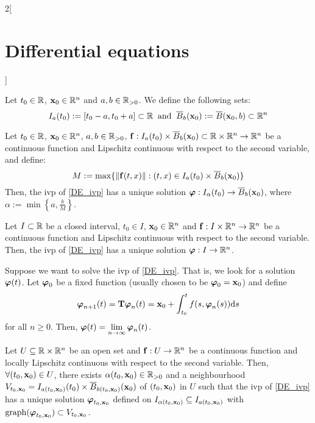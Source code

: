 \documentclass[../../../main.tex]{subfiles}
\begin{document}
\begin{multicols}{2}[\section{Differential equations}]
\begin{corollary}
  \end{corollary}
  \begin{definition}
    Let $t_0\in\mathbb{R}$, $\boldsymbol{\mathrm{x}}_0\in\mathbb{R}^n$ and $a,b\in\mathbb{R}_{>0}$. We define the following sets: $$I_a(t_0):=[t_0-a,t_0+a]\subset\mathbb{R}\;\;\text{and}\;\;\overline{B}_{b}(\boldsymbol{\mathrm{x}}_0):=\overline{B}(\boldsymbol{\mathrm{x}}_0,b)\subset\mathbb{R}^n$$
  \end{definition}
  \begin{theorem}\label{DE_picard}
    Let $t_0\in\mathbb{R}$, $\boldsymbol{\mathrm{x}}_0\in\mathbb{R}^n$, $a,b\in\mathbb{R}_{>0}$, $\boldsymbol{\mathrm{f}}:I_a(t_0)\times\overline{B}_{b}(\boldsymbol{\mathrm{x}}_0)\subset\mathbb{R}\times\mathbb{R}^n\rightarrow\mathbb{R}^n$ be a continuous function and Lipschitz continuous with respect to the second variable, and define: $$M:=\max\{\|\boldsymbol{\mathrm{f}}(t,x)\|:(t,x)\in I_a(t_0)\times\overline{B}_{b}(\boldsymbol{\mathrm{x}}_0)\}$$ Then, the ivp of \cref{DE_ivp} has a unique solution $\boldsymbol{\mathrm{\varphi}}:I_\alpha(t_0)\rightarrow\overline{B}_{b}(\boldsymbol{\mathrm{x}}_0)$, where $\alpha:=\min\left\{a,\frac{b}{M}\right\}$.
  \end{theorem}
  \begin{corollary}
    Let $I\subset \mathbb{R}$ be a closed interval, $t_0\in I$, $\boldsymbol{\mathrm{x}}_0\in\mathbb{R}^n$ and $\boldsymbol{\mathrm{f}}:I\times\mathbb{R}^n\rightarrow\mathbb{R}^n$ be a continuous function and Lipschitz continuous with respect to the second variable. Then, the ivp of \cref{DE_ivp} has a unique solution $\boldsymbol{\mathrm{\varphi}}:I\rightarrow\mathbb{R}^n$.
  \end{corollary}
  \begin{corollary}
    Suppose we want to solve the ivp of \cref{DE_ivp}. That is, we look for a solution $\boldsymbol{\mathrm{\varphi}}(t)$. Let $\boldsymbol{\mathrm{\varphi}}_0$ be a fixed function (usually chosen to be $\boldsymbol{\mathrm{\varphi}}_0=\boldsymbol{\mathrm{x}}_0$) and define
    $$\boldsymbol{\mathrm{\varphi}}_{n+1}(t)=\boldsymbol{\mathrm{T}}\boldsymbol{\mathrm{\varphi}}_n(t)=\boldsymbol{\mathrm{x}}_0+\int_{t_0}^tf(s,\boldsymbol{\mathrm{\varphi}}_n(s))\dd s$$
    for all $n\geq 0$. Then, $\displaystyle\boldsymbol{\mathrm{\varphi}}(t)=\lim_{n\to\infty}\boldsymbol{\mathrm{\varphi}}_n(t)$.
  \end{corollary}
  \begin{corollary}
    Let $U\subseteq\mathbb{R}\times\mathbb{R}^n$ be an open set and $\boldsymbol{\mathrm{f}}:U\rightarrow\mathbb{R}^n$ be a continuous function and locally Lipschitz continuous with respect to the second variable. Then, $\forall(t_0,\boldsymbol{\mathrm{x}}_0)\in U$, there exists $\alpha(t_0,\boldsymbol{\mathrm{x}}_0)\in\mathbb{R}_{>0}$ and a neighbourhood $V_{t_0,\boldsymbol{\mathrm{x}}_0}=I_{a(t_0,\boldsymbol{\mathrm{x}}_0)}(t_0)\times\overline{B}_{b(t_0,\boldsymbol{\mathrm{x}}_0)}(\boldsymbol{\mathrm{x}}_0)$ of $(t_0,\boldsymbol{\mathrm{x}}_0)$ in $U$ such that the ivp of \cref{DE_ivp} has a unique solution $\boldsymbol{\mathrm{\varphi}}_{t_0,\boldsymbol{\mathrm{x}}_0}$ defined on $I_{\alpha(t_0,\boldsymbol{\mathrm{x}}_0)}\subseteq I_{a(t_0,\boldsymbol{\mathrm{x}}_0)}$ with $\operatorname{graph}(\boldsymbol{\mathrm{\varphi}}_{t_0,\boldsymbol{\mathrm{x}}_0})\subset V_{t_0,\boldsymbol{\mathrm{x}}_0}$.

\end{corollary}
\end{multicols}
\end{document}
